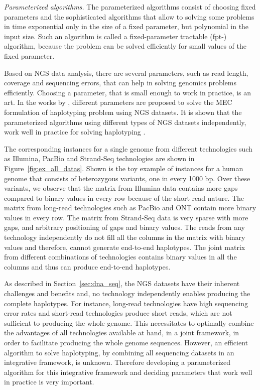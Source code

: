 \textit{Parameterized algorithms.} 
The parameterized algorithms consist of choosing fixed parameters and the sophisticated algorithms that allow to solving some problems in time exponential only in the size of a fixed parameter, but polynomial in the input size. 
Such an algorithm is called a fixed-parameter tractable (fpt-) algorithm, because the problem can be solved efficiently for small values of the fixed parameter.

Based on NGS data analysis, there are several parameters, such as read length, coverage and sequencing errors, that can help in solving genomics problems efficiently. 
Choosing a parameter, that is small enough to work in practice, is an art.
In the works by \cite{he2010optimal,Patterson2015,Pirola2015}, different parameters are proposed to solve the MEC formulation of haplotyping problem using NGS datasets.
It is shown that the parameterized algorithms using different types of NGS datasets independently, work well in practice for solving haplotyping \citep{martin2016whatshap, klau2017guided}. 

\begin{example}
 The corresponding \MEC instances for a single genome from different technologies such as Illumina, PacBio and Strand-Seq technologies are shown in Figure~\ref{fig:ex_all_datas}. 
 Shown is the toy example of \MEC instances for a human genome that consists of heterozygous variants, one in every 1000 bp. Over these variants, we observe that the matrix from Illumina data contains more gaps compared to binary values in every row because of the short read nature.
 The matrix from long-read technologies such as PacBio and ONT contain more binary values in every row. The matrix from Strand-Seq data is very sparse with more gaps, and arbitrary positioning of gaps and binary values. 
 The reads from any technology independently do not fill all the columns in the matrix with binary values and therefore, cannot generate end-to-end haplotypes.
 The joint matrix from different combinations of technologies contains binary values in all the columns and thus can produce end-to-end haplotypes.
\end{example}

As described in Section~\ref{sec:dna_seq}, the NGS datasets have their inherent challenges and benefits and, no technology independently enables producing the complete haplotypes.
For instance, long-read technologies have high sequencing error rates and short-read technologies produce short reads, which are not sufficient to producing the whole genome.
This necessitates to optimally combine the advantages of all technologies available at hand, in a joint framework, in order to facilitate producing the whole genome sequences.
However, an efficient algorithm to solve haplotyping, by combining all sequencing datasets in an integrative framework, is unknown.
Therefore developing a parameterized algorithm for this integrative framework and deciding parameters that work well in practice is very important. 

